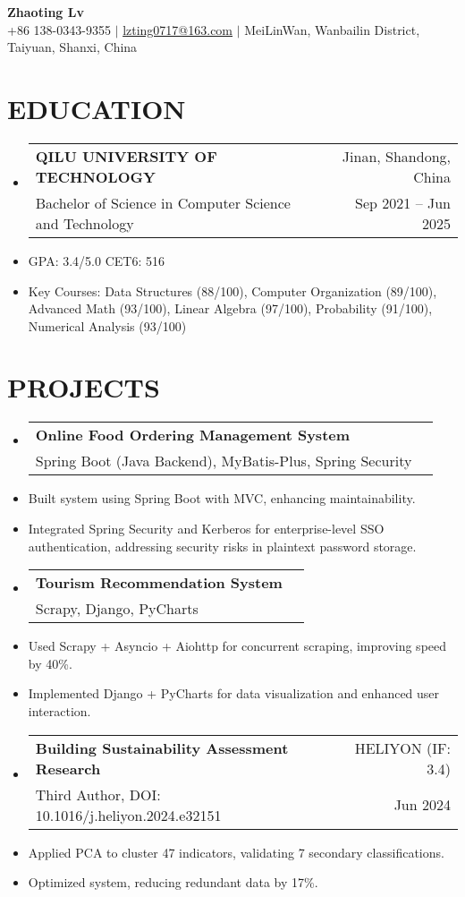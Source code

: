 \documentclass[a4paper,11pt]{article}
\makeatletter
\newenvironment{resumeList}{\begin{itemize}[leftmargin=*,label={}]}{\end{itemize}}
\newcommand{\resumeItem}[1]{\item\small{#1}}
\newcommand{\resumeEntry}[4]{
  \item \begin{tabular*}{0.97\textwidth}{l@{\extracolsep{\fill}}r}
    \textbf{#1} & #2 \\
    #3 & #4 \\
  \end{tabular*}
}
\makeatother
\begin{document}
\begin{center}
    {\Huge\bfseries Zhaoting Lv} \\ \vspace{3pt}
    \small
    \faMobile \hspace{.5pt} +86 138-0343-9355 $|$ 
    \faAt \hspace{.5pt} \href{mailto:lvzting0717@163.com}{lzting0717@163.com} $|$ 
    \faMapMarker \hspace{.5pt} MeiLinWan, Wanbailin District, Taiyuan, Shanxi, China 
\end{center}

\section{EDUCATION}
\begin{resumeList}
    \resumeEntry{QILU UNIVERSITY OF TECHNOLOGY}
    {Jinan, Shandong, China}
    {Bachelor of Science in Computer Science and Technology}
    {Sep 2021 -- Jun 2025}
    
    \resumeItem{GPA: 3.4/5.0 \qquad CET6: 516} 
    \resumeItem{Key Courses: Data Structures (88/100), Computer Organization (89/100), Advanced Math (93/100), Linear Algebra (97/100), Probability (91/100), Numerical Analysis (93/100)}
\end{resumeList}

\section{PROJECTS}
\begin{resumeList}
    \resumeEntry{Online Food Ordering Management System}
    {}
    {Spring Boot (Java Backend), MyBatis-Plus, Spring Security}
    {}

    \resumeItem{Built system using Spring Boot with MVC, enhancing maintainability.}
    \resumeItem{Integrated Spring Security and Kerberos for enterprise-level SSO authentication, addressing security risks in plaintext password storage.}

    \resumeEntry{Tourism Recommendation System}
    {}
    {Scrapy, Django, PyCharts}
    {}

    \resumeItem{Used Scrapy + Asyncio + Aiohttp for concurrent scraping, improving speed by 40\%.}
    \resumeItem{Implemented Django + PyCharts for data visualization and enhanced user interaction.}

    \resumeEntry{Building Sustainability Assessment Research}
    {HELIYON (IF: 3.4)}
    {Third Author, DOI: 10.1016/j.heliyon.2024.e32151}
    {Jun 2024}

    \resumeItem{Applied PCA to cluster 47 indicators, validating 7 secondary classifications.}
    \resumeItem{Optimized system, reducing redundant data by 17\%.}
\end{resumeList}
\end{document}
